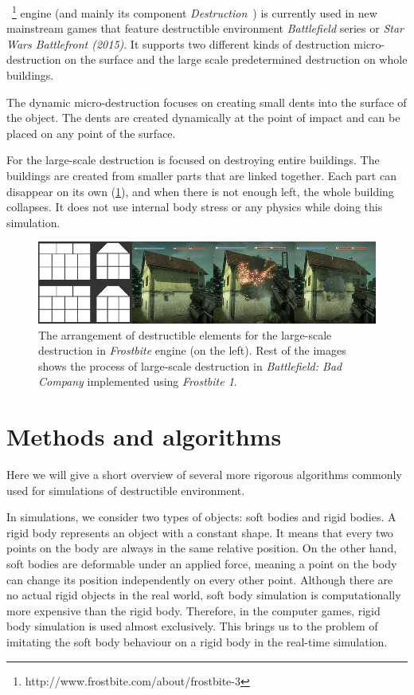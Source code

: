 ~\footnote{http://www.frostbite.com/about/frostbite-3} engine (and mainly its component \emph{Destruction}~\cite{destruction}) is currently used in new mainstream games that feature destructible environment \eg \emph{Battlefield} series or \emph{Star Wars Battlefront (2015)}. It supports two different kinds of destruction micro-destruction on the surface and the large scale predetermined destruction on whole buildings. 

The dynamic micro-destruction focuses on creating small dents into the surface of the object. The dents are created dynamically at the point of impact and can be placed on any point of the surface.

For the large-scale destruction is focused on destroying entire buildings. The buildings are created from smaller parts that are linked together. Each part can disappear on its own (\cref{fig:frostbite}), and when there is not enough left, the whole building collapses. It does not use internal body stress or any physics while doing this simulation. 

\begin{figure}
\centering
\includegraphics[width=\textwidth]{img/frostbite}
\caption{The arrangement of destructible elements for the large-scale destruction in \emph{Frostbite} engine (on the left). Rest of the images shows the process of large-scale destruction in \emph{Battlefield: Bad Company} implemented using \emph{Frostbite 1}.}
\label{fig:frostbite}
\end{figure}

\section{Methods and algorithms}

Here we will give a short overview of several more rigorous algorithms commonly used for simulations of destructible environment. 

In simulations, we consider two types of objects: soft bodies and rigid bodies. A rigid body represents an object with a constant shape. It means that every two points on the body are always in the same relative position. On the other hand, soft bodies are deformable under an applied force, meaning a point on the body can change its position independently on every other point. Although there are no actual rigid objects in the real world, soft body simulation is computationally more expensive than the rigid body. Therefore, in the computer games, rigid body simulation is used almost exclusively. This brings us to the problem of imitating the soft body behaviour on a rigid body in the real-time simulation. 

